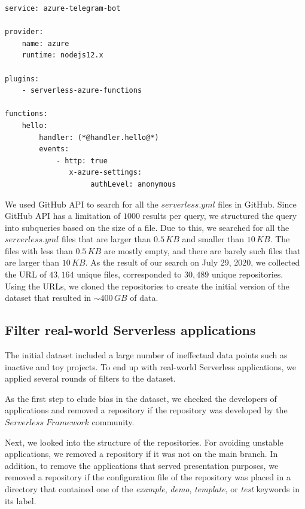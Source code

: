 \begin{lstlisting}[frame=single, caption=An example of a serverless.yml file., label={lst:example}, captionpos=b]
service: azure-telegram-bot 

provider:  
	name: azure
	runtime: nodejs12.x  
	
plugins:  
	- serverless-azure-functions 

functions:
	hello:    
		handler: (*@handler.hello@*)
		events:   
			- http: true        
			   x-azure-settings:          
			   		authLevel: anonymous
\end{lstlisting}

\vspace{2mm}

We used GitHub API to search for all the $serverless.yml$ files in GitHub. 
Since GitHub API has a limitation of $1000$ results per query, we structured 
the query into subqueries based on the size of a file. 
Due to this, we searched for all the $serverless.yml$ files that are larger 
than $0.5\,KB$ and smaller than $10\,KB$. The files with less than 
$0.5\,KB$ are mostly empty, and there are barely such files that are 
larger than $10\,KB$. As the result of our search on July 29, 2020, 
we collected the URL of $43,164$ unique files, corresponded to 
$30,489$ unique repositories. Using the URLs, we cloned 
the repositories to create the initial version of the dataset that 
resulted in $\sim 400 \, GB$ of data.

\subsection{Filter real-world Serverless applications} \label{phaseB}
The initial dataset included a large number of ineffectual data points 
such as inactive and toy projects. To end up with real-world Serverless 
applications, we applied several rounds of filters to the dataset.

As the first step to elude bias in the dataset, we checked the developers 
of applications and removed a repository if the repository was developed 
by the $Serverless \; Framework$ community. 

Next, we looked into the structure of the repositories. 
For avoiding unstable applications, we removed a repository if it was not 
on the main branch. In addition, to remove the applications that served 
presentation purposes, we removed a repository if the configuration file 
of the repository was placed in a directory that contained one of the 
\emph{example}, \emph{demo}, \emph{template}, or \emph{test} 
keywords in its label.

